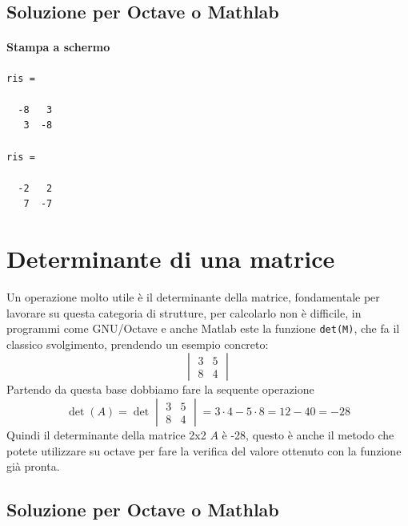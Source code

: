 \documentclass{book}
\begin{document}
\subsection{Soluzione per Octave o Mathlab}
\label{sec:solmatoctes1}

\paragraph{Stampa a schermo}
\begin{verbatim}
ris =

  -8   3
   3  -8

ris =

  -2   2
   7  -7
\end{verbatim}


\section{Determinante di una matrice}
\label{sec:mtxdet}
Un operazione molto utile è il determinante della matrice, fondamentale per
lavorare su questa categoria di strutture, per calcolarlo non è difficile, in
programmi come GNU/Octave e anche Matlab este la funzione \lstinline|det(M)|,
che fa il classico svolgimento, prendendo un esempio concreto:
\begin{equation}
  \label{eq:es2}
  \begin{vmatrix}
    3 & 5\\
    8 & 4
  \end{vmatrix}
\end{equation}
Partendo da questa base dobbiamo fare la sequente operazione
\begin{equation}
  \label{eq:es2_sv}
  \det(A) =\det \begin{vmatrix}
    3 & 5\\
    8 & 4
  \end{vmatrix}= 3\cdot 4 -5\cdot 8 = 12 - 40 = -28
\end{equation}
Quindi il determinante della matrice 2x2 $A$ è -28, questo è anche il metodo che
potete utilizzare su octave per fare la verifica del valore ottenuto con la
funzione già pronta.
\subsection{Soluzione per Octave o Mathlab}
\label{sec:solmatoctes2}
\end{document}
